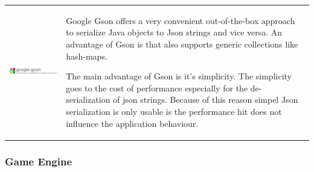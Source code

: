 \begin{table}[h!]
  \centering
  \begin{tabular}{ c m{9cm} }
    \begin{minipage}{.3\textwidth}
      \includegraphics[width=\linewidth]{images/dependencies/google-gson}
    \end{minipage}&
    Google Gson offers a very convenient out-of-the-box approach to serialize
    Java objects to Json strings and vice versa. An advantage of Gson is that
    also supports generic collections like hash-maps.
    
    The main advantage of Gson is it's simplicity. The simplicity goes to the
    cost of performance especially for the de-serialization of json strings.
    Because of this reason simpel Json serialization is only usable is the
    performance hit does not influence the application behaviour.
  \end{tabular}
\end{table}
\FloatBarrier

\subsubsection{Game Engine}

